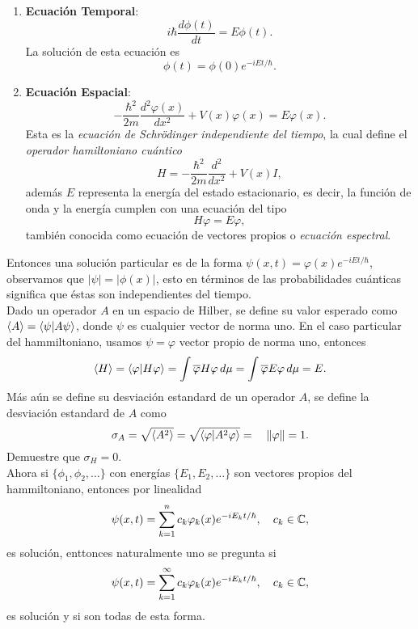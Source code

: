\documentclass[main.tex]{subfiles}
\begin{document}
\begin{enumerate}
    \item \textbf{Ecuación Temporal}:
    \[
    i\hbar \frac{d \phi(t)}{dt} = E \phi(t).
    \]
    La solución de esta ecuación es
    \[
    \phi(t) = \phi(0) e^{-iEt/\hbar}.
    \]

    \item \textbf{Ecuación Espacial}:
    \[
    -\frac{\hbar^2}{2m} \frac{d^2 \varphi(x)}{dx^2} + V(x) \varphi(x) = E \varphi(x).
    \]
    Esta es la \emph{ecuación de Schrödinger independiente del tiempo}, la cual define el \emph{operador hamiltoniano cuántico}
    \[
    H =-\frac{\hbar^2}{2m} \frac{d^2 }{dx^2} + V(x)I,
    \]
    además \(E\) representa la energía del estado estacionario, es decir, la función de onda y la energía cumplen con una ecuación del tipo
    \[
    H\varphi=E\varphi,
    \]
    también conocida como ecuación de vectores propios o \emph{ecuación espectral}.
\end{enumerate}

Entonces una solución particular es de la forma \(\psi(x,t)=\varphi(x)e^{-iEt/\hbar}\), observamos que \(|\psi|=|\phi(x)|\), esto en términos de las probabilidades cuánticas significa que éstas son independientes del tiempo.\\
\obs Dado un operador \(A\) en un espacio de Hilber, se define su valor esperado como \(\braket{A}=\braket{\psi| A \psi}\), donde \(\psi\) es cualquier vector de norma uno. En el caso particular del hammiltoniano, usamos \(\psi=\varphi\) vector propio de norma uno, entonces
\[
    \braket{H}=\braket{\varphi|H\varphi}=\int\overline{\varphi}H\varphi\,d\mu=\int\overline{\varphi}E\varphi\,d\mu=E.
\]
\noindent Más aún se define su desviación estandard de un operador \(A\), se define la desviación estandard de \(A\) como
\[
    \sigma_A=\sqrt{\braket{A^2}}=\sqrt{\braket{\varphi|A^2\varphi}}=\quad\|\varphi\|=1.
\]
\exe Demuestre que \(\sigma_H=0\).\\
Ahora si \(\{\phi_1,\phi_2,\dots\}\) con energías \(\{E_1,E_2,\dots\}\) son vectores propios del hammiltoniano, entonces por linealidad
\[
\psi(x,t)=\sum_{k=1}^nc_k\varphi_k(x)e^{-iE_kt/\hbar},\quad c_k\in\mathbb C ,
\]
es solución, enttonces naturalmente uno se pregunta si
\[
\psi(x,t)=\sum_{k=1}^{\infty}c_k\varphi_k(x)e^{-iE_kt/\hbar},\quad c_k\in\mathbb C ,
\]
es solución y si son todas de esta forma.
\end{document}
